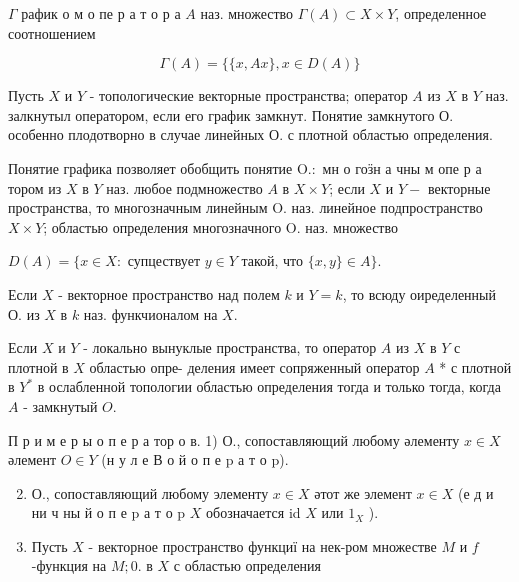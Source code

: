 \documentclass[10pt]{article}
\begin{document}
$\Gamma$ рафик о м о пе р а т о р а $A$ наз. множество $\Gamma(A) \subset X \times Y$, определенное соотношением



\[

\Gamma(A)=\{\{x, A x\}, x \in D(A)\}

\]



Пусть $X$ и $Y$ - топологические векторные пространства; оператор $A$ из $X$ в $Y$ наз. залкнутыл оператором, если его график замкнут. Понятие замкнутого О. особенно плодотворно в случае линейных $О$. с плотной областью определения.



Понятие графика позволяет обобщить понятие $\mathrm{O} .:$ мн о гоӟн а чны м опе р а тором из $X$ в $Y$ наз. любое подмножество $A$ в $X \times Y$; если $X$ и $Y-$ векторные пространства, то многозначным линейным O. наз. линейное подпространство $X \times Y$; областью определения многозначного $\mathrm{O}$. наз. множество



$D(A)=\{x \in X:$ супцествует $y \in Y$ такой, что $\{x, y\} \in A\}$.



Если $X$ - векторное пространство над полем $k$ и $Y=k$, то всюду оиределенный О. из $X$ в $k$ наз. функчионалом на $X$.



Если $X$ и $Y$ - локально вынуклые пространства, то оператор $A$ из $X$ в $Y$ с плотной в $X$ областью опре- деления имеет сопряженный оператор $A$ * с плотной в $Y^{*}$ в ослабленной топологии областью определения тогда и только тогда, когда $A$ - замкнутый $O$.



П р и м е р ы о п е р а тор о в. 1) О., сопоставляющий любому әлементу $x \in X$ әлемент $O \in Y$ (н у л е В $о$ й $о$ п е p а т о p).



\begin{enumerate}

  \setcounter{enumi}{1}

  \item О., сопоставляющий любому элементу $x \in X$ әтот же элемент $x \in X$ (е д и ни ч ны й о п е p а т о p $X$ обозначается id $X$ или $1_{X}$ ).



  \item Пусть $X$ - векторное пространство функциї на нек-ром множестве $M$ и $f$-функция на $M ; 0$. в $X$ с областью определения



\end{enumerate}
\end{document}
